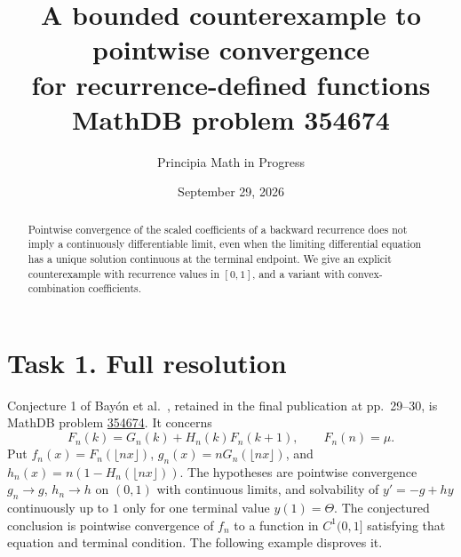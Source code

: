 \documentclass[11pt]{article}
\title{A bounded counterexample to pointwise convergence\\
for recurrence-defined functions\\[3pt]
\large MathDB problem 354674}
\author{Principia Math in Progress}
\date{September 29, 2026}
\begin{document}
\maketitle
\begin{abstract}
Pointwise convergence of the scaled coefficients of a backward recurrence
does not imply a continuously differentiable limit, even when the limiting
differential equation has a unique solution continuous at the terminal
endpoint. We give an explicit counterexample with recurrence values in
$[0,1]$, and a variant with convex-combination coefficients.
\end{abstract}

\section*{Task 1. Full resolution}
Conjecture 1 of Bay\'on et al.\ \cite{source}, retained in the final
publication at pp.~29--30, is MathDB problem
\href{https://mathdb.com/p/354674}{354674}. It concerns
\[
 F_n(k)=G_n(k)+H_n(k)F_n(k+1),\qquad F_n(n)=\mu.
\]
Put $f_n(x)=F_n(\lfloor nx\rfloor)$,
$g_n(x)=nG_n(\lfloor nx\rfloor)$, and
$h_n(x)=n(1-H_n(\lfloor nx\rfloor))$.
The hypotheses are pointwise convergence $g_n\to g$, $h_n\to h$ on
$(0,1)$ with continuous limits, and solvability of
$y'=-g+hy$ continuously up to $1$ only for one terminal value
$y(1)=\Theta$. The conjectured conclusion is pointwise convergence
of $f_n$ to a function in $C^1(0,1]$ satisfying that equation and
terminal condition. The following example disproves it.
\end{document}
